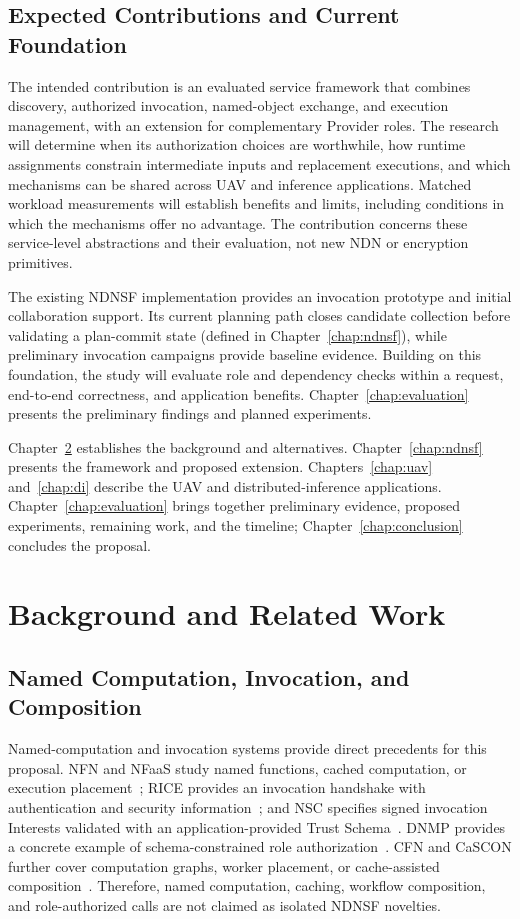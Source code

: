 \section{Expected Contributions and Current Foundation}
The intended contribution is an evaluated service framework that combines discovery, authorized invocation, named-object exchange, and execution management, with an extension for complementary Provider roles. The research will determine when its authorization choices are worthwhile, how runtime assignments constrain intermediate inputs and replacement executions, and which mechanisms can be shared across UAV and inference applications. Matched workload measurements will establish benefits and limits, including conditions in which the mechanisms offer no advantage. The contribution concerns these service-level abstractions and their evaluation, not new NDN or encryption primitives.

The existing NDNSF implementation provides an invocation prototype and initial collaboration support. Its current planning path closes candidate collection before validating a plan-commit state (defined in Chapter~\ref{chap:ndnsf}), while preliminary invocation campaigns provide baseline evidence. Building on this foundation, the study will evaluate role and dependency checks within a request, end-to-end correctness, and application benefits. Chapter~\ref{chap:evaluation} presents the preliminary findings and planned experiments.

Chapter~\ref{chap:related-work} establishes the background and alternatives. Chapter~\ref{chap:ndnsf} presents the framework and proposed extension. Chapters~\ref{chap:uav} and~\ref{chap:di} describe the UAV and distributed-inference applications. Chapter~\ref{chap:evaluation} brings together preliminary evidence, proposed experiments, remaining work, and the timeline; Chapter~\ref{chap:conclusion} concludes the proposal.

\chapter{Background and Related Work}
\label{chap:related-work}


\section{Named Computation, Invocation, and Composition}
Named-computation and invocation systems provide direct precedents for this proposal. NFN and NFaaS study named functions, cached computation, or execution placement~\cite{nfn,nfaas}; RICE provides an invocation handshake with authentication and security information~\cite{rice}; and NSC specifies signed invocation Interests validated with an application-provided Trust Schema~\cite{nsc}. DNMP provides a concrete example of schema-constrained role authorization~\cite{dnmp}. CFN and CaSCON further cover computation graphs, worker placement, or cache-assisted composition~\cite{cfn,cascon}. Therefore, named computation, caching, workflow composition, and role-authorized calls are not claimed as isolated NDNSF novelties.

